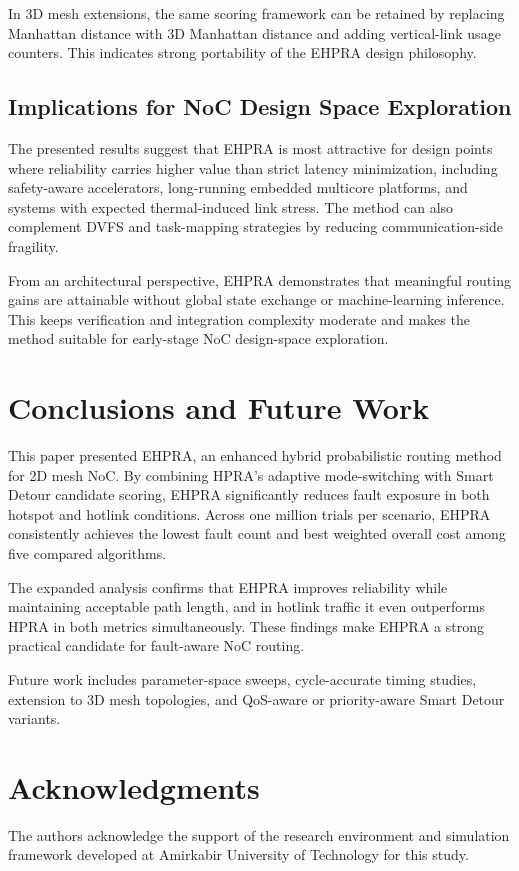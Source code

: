 \documentclass[10pt,a4paper]{article}
\begin{document}
In 3D mesh extensions, the same scoring framework can be retained by replacing Manhattan distance with 3D Manhattan distance and adding vertical-link usage counters. This indicates strong portability of the EHPRA design philosophy.

\subsection{Implications for NoC Design Space Exploration}
The presented results suggest that EHPRA is most attractive for design points where reliability carries higher value than strict latency minimization, including safety-aware accelerators, long-running embedded multicore platforms, and systems with expected thermal-induced link stress. The method can also complement DVFS and task-mapping strategies by reducing communication-side fragility.

From an architectural perspective, EHPRA demonstrates that meaningful routing gains are attainable without global state exchange or machine-learning inference. This keeps verification and integration complexity moderate and makes the method suitable for early-stage NoC design-space exploration.


\section{Conclusions and Future Work}
This paper presented EHPRA, an enhanced hybrid probabilistic routing method for 2D mesh NoC. By combining HPRA's adaptive mode-switching with Smart Detour candidate scoring, EHPRA significantly reduces fault exposure in both hotspot and hotlink conditions. Across one million trials per scenario, EHPRA consistently achieves the lowest fault count and best weighted overall cost among five compared algorithms.

The expanded analysis confirms that EHPRA improves reliability while maintaining acceptable path length, and in hotlink traffic it even outperforms HPRA in both metrics simultaneously. These findings make EHPRA a strong practical candidate for fault-aware NoC routing.

Future work includes parameter-space sweeps, cycle-accurate timing studies, extension to 3D mesh topologies, and QoS-aware or priority-aware Smart Detour variants.

\section*{Acknowledgments}
The authors acknowledge the support of the research environment and simulation framework developed at Amirkabir University of Technology for this study.
\end{document}
